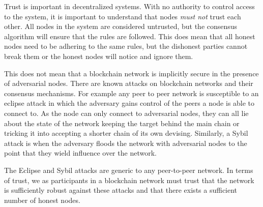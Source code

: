Trust is important in decentralized systems. With no authority to control access to the system, it is important to understand that nodes \emph{must not} trust each other. All nodes in the system are considered untrusted, but the consensus algorithm will ensure that the rules are followed. This does mean that all honest nodes need to be adhering to the same rules, but the dishonest parties cannot break them or the honest nodes will notice and ignore them.

This does not mean that a blockchain network is implicitly secure in the presence of adversarial nodes. There are known attacks on blockchain networks and their consensus mechanisms. For example any peer to peer network is susceptible to an eclipse attack \cite{heilmanEclipseAttacksBitcoin2015} in which the adversary gains control of the peers a node is able to connect to. As the node can only connect to adversarial nodes, they can all lie about the state of the network keeping the target behind the main chain or tricking it into accepting a shorter chain of its own devising. Similarly, a Sybil attack \cite{douceurSybilAttack2002} is when the adversary floods the network with adversarial nodes to the point that they wield influence over the network.

The Eclipse and Sybil attacks are generic to any peer-to-peer network. In terms of trust, we as participants in a blockchain network must trust that the network is sufficiently robust against these attacks and that there exists a sufficient number of honest nodes.

